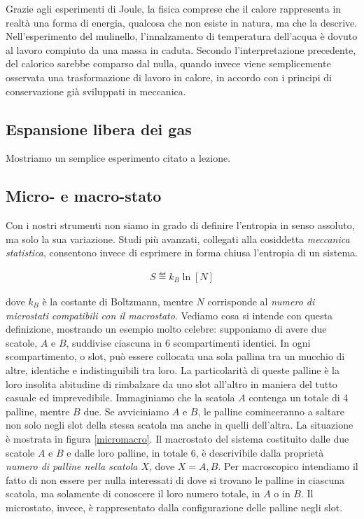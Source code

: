 Grazie agli esperimenti di Joule, la fisica comprese che il calore
rappresenta in realtà una forma di energia, qualcosa che
non esiste in natura, ma che la descrive. Nell'esperimento del
mulinello, l'innalzamento di temperatura dell'acqua è dovuto al
lavoro compiuto da una massa in caduta. Secondo l'interpretazione
precedente, del calorico sarebbe comparso dal nulla, quando invece
viene semplicemente osservata una trasformazione di lavoro in calore,
in accordo con i principi di conservazione già sviluppati in meccanica.


\subsection{Espansione libera dei gas}
Mostriamo un semplice esperimento citato a lezione.


\subsection{Micro- e macro-stato}
Con i nostri strumenti non siamo in grado di definire l'entropia in
senso assoluto, ma solo la sua variazione. Studi più avanzati,
collegati alla cosiddetta \textit{meccanica statistica}, consentono
invece di esprimere in forma chiusa l'entropia di un sistema.

\begin{align}
    S \eqdef k_B \ln [N]\label{entropia_meccanica_statistica}
\end{align}

\noindent dove $k_B$ è la costante di Boltzmann, mentre $N$
corrisponde al \textit{numero di microstati compatibili con il
macrostato}. Vediamo cosa si intende con questa definizione,
mostrando un esempio molto celebre: supponiamo di avere due
scatole, $A$ e $B$, suddivise ciascuna in 6 scompartimenti
identici. In ogni scompartimento, o slot, può essere collocata
una sola pallina tra un mucchio di altre, identiche e indistinguibili
tra loro. La particolarità
di queste palline è la loro insolita abitudine di rimbalzare
da uno slot all'altro in maniera del tutto casuale ed imprevedibile.
Immaginiamo che la scatola $A$ contenga
un totale di 4 palline, mentre $B$ due. Se avviciniamo $A$ e
$B$, le palline cominceranno a saltare non solo negli slot
della stessa scatola ma anche in quelli dell'altra. La situazione è
mostrata in figura \ref{micromacro}. Il macrostato del sistema
costituito dalle due scatole $A$ e $B$ e dalle loro palline,
in totale 6, è descrivibile dalla proprietà \textit{numero di palline nella scatola $X$},
dove $X = A, B$. Per macroscopico intendiamo
il fatto di non essere per nulla interessati di dove si trovano
le palline in ciascuna scatola, ma solamente di conoscere il
loro numero totale, in $A$ o in $B$. Il microstato, invece,
è rappresentato dalla configurazione delle palline negli slot.

